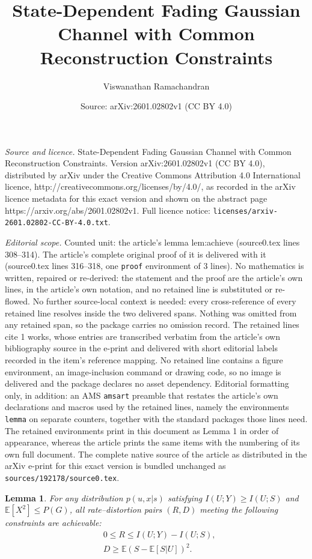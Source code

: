 \documentclass[10pt,a4paper]{amsart}
\title{State-Dependent Fading Gaussian Channel with Common Reconstruction Constraints}
\author{Viswanathan Ramachandran}
\date{Source: arXiv:2601.02802v1 (CC BY 4.0)}
\newtheorem{lemma}{Lemma}
\def\eE{\mathbb E}
\begin{document}
\maketitle

\noindent\emph{Source and licence.} State-Dependent Fading Gaussian Channel with Common Reconstruction Constraints. Version arXiv:2601.02802v1 (CC BY 4.0), distributed by arXiv under the Creative Commons Attribution 4.0 International licence, http://creativecommons.org/licenses/by/4.0/, as recorded in the arXiv licence metadata for this exact version and shown on the abstract page https://arxiv.org/abs/2601.02802v1. Full licence notice: \texttt{licenses/arxiv-2601.02802-CC-BY-4.0.txt}.\par\smallskip

\noindent\textit{Editorial scope.} Counted unit: the article's lemma lem:achieve (source0.tex lines 308--314). The article's complete original proof of it is delivered with it (source0.tex lines 316--318, one \texttt{proof} environment of 3 lines). No mathematics is written, repaired or re-derived: the statement and the proof are the article's own lines, in the article's own notation, and no retained line is substituted or re-flowed.  No further source-local context is needed: every cross-reference of every retained line resolves inside the two delivered spans.  Nothing was omitted from any retained span, so the package carries no omission record.  The retained lines cite 1 works, whose entries are transcribed verbatim from the article's own bibliography source in the e-print and delivered with short editorial labels recorded in the item's reference mapping.  No retained line contains a figure environment, an image-inclusion command or drawing code, so no image is delivered and the package declares no asset dependency.  Editorial formatting only, in addition: an AMS \texttt{amsart} preamble that restates the article's own declarations and macros used by the retained lines, namely the environments \texttt{lemma} on separate counters, together with the standard packages those lines need.  The retained environments print in this document as Lemma 1 in order of appearance, whereas the article prints the same items with the numbering of its own full document.  The complete native source of the article as distributed in the arXiv e-print for this exact version is bundled unchanged as \texttt{sources/192178/source0.tex}.
\begin{lemma} \label{lem:achieve}
For any distribution $p(u,x|s)$ satisfying ${I(U;Y) \geq I(U;S)}$ and $\mathbb{E}[X^2] \leq P(G)$, all rate–distortion pairs $(R,D)$ meeting the following constraints are achievable:
\begin{align}
&0 \leq  R \leq I(U;Y) - I(U;S), \label{eq:achieve:rate} \\
&D  \geq \eE \left( S - \eE \left[ S|U \right] \right)^2. \label{eq:achieve:dist}
\end{align}
\end{lemma}
\end{document}
